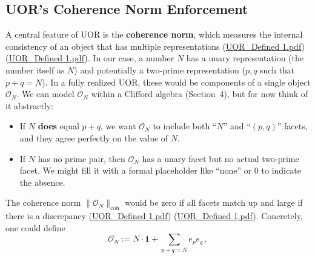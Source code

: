 \documentclass[12pt]{article}
\begin{document}
\subsection{UOR’s Coherence Norm Enforcement}
A central feature of UOR is the \textbf{coherence norm}, which measures the internal consistency of an object that has multiple representations (\href{file://file-Rasc2uW2LQtFGLmNLDMJzD#:~:text=%E2%97%8F%20Coherence%20Norm%20%24,the%20%E2%80%9Csize%E2%80%9D%20or%20coherence%20of}{UOR\_Defined 1.pdf}) (\href{file://file-Rasc2uW2LQtFGLmNLDMJzD#:~:text=match%20at%20L393%20%24,mixing%20basis%20blades}{UOR\_Defined 1.pdf}). In our case, a number $N$ has a unary representation (the number itself as $N$) and potentially a two-prime representation ($p,q$ such that $p+q=N$). In a fully realized UOR, these would be components of a single object $\mathcal{O}_N$. We can model $\mathcal{O}_N$ within a Clifford algebra (Section~4), but for now think of it abstractly: 
\begin{itemize}[leftmargin=*,label={--}]
  \item If $N$ \textbf{does} equal $p+q$, we want $\mathcal{O}_N$ to include both “$N$” and “$(p,q)$” facets, and they agree perfectly on the value of $N$.
  \item If $N$ has no prime pair, then $\mathcal{O}_N$ has a unary facet but no actual two-prime facet. We might fill it with a formal placeholder like ``none'' or $0$ to indicate the absence.
\end{itemize}
The coherence norm $\|\mathcal{O}_N\|_{\text{coh}}$ would be zero if all facets match up and large if there is a discrepancy (\href{file://file-Rasc2uW2LQtFGLmNLDMJzD#:~:text=%E2%97%8F%20Coherence%20Norm%20%24,the%20%E2%80%9Csize%E2%80%9D%20or%20coherence%20of}{UOR\_Defined 1.pdf}) (\href{file://file-Rasc2uW2LQtFGLmNLDMJzD#:~:text=match%20at%20L393%20%24,mixing%20basis%20blades}{UOR\_Defined 1.pdf}). Concretely, one could define 
\[
\mathcal{O}_N := N\cdot \mathbf{1} + \sum_{p+q=N} e_p e_q\,,
\]
\end{document}
